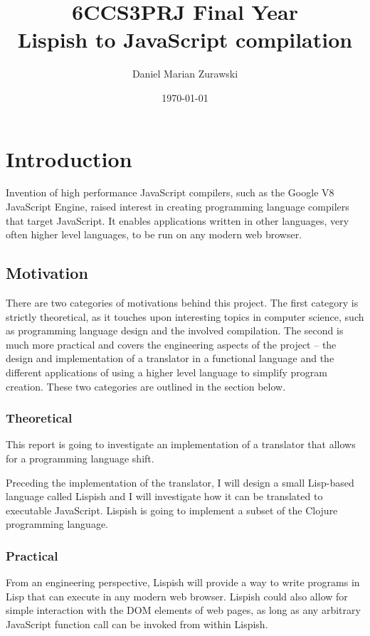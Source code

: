 \documentclass[11pt]{informatics-report}
\title{6CCS3PRJ Final Year\\\vspace{0.2cm}Lispish to JavaScript compilation}
\author{Daniel Marian Zurawski}
\date{\today}
\begin{document}
\createFrontMatter
\onehalfspacing
\tableofcontents
\doublespacing


\chapter{Introduction}
Invention of high performance JavaScript compilers, such as the Google V8 JavaScript Engine, raised interest in creating programming language 
compilers that target JavaScript. It enables applications written in other languages, very often higher level languages, to be run on any modern web browser.
 
 \section{Motivation}
There are two categories of motivations behind this project. The first category is strictly theoretical, as it touches upon interesting topics in computer science, such as programming language design and the involved compilation. The second is much more practical and covers the engineering aspects of the project -- the design and implementation of a translator in a functional language and the different applications of using a higher level language to simplify program creation.  
These two categories are outlined in the section below.


\subsection{Theoretical}
This report is going to investigate an implementation of a translator that allows for a programming language shift.

Preceding the implementation of the translator, I will design a small Lisp-based language called Lispish and I will investigate how it can be translated to executable JavaScript. Lispish is going to implement a subset of the Clojure programming language.

\subsection{Practical}
From an engineering perspective, Lispish will provide a way to write programs in Lisp that can execute in any modern web browser. Lispish could also allow for simple interaction with the DOM elements of web pages, as long as any arbitrary JavaScript function call can be invoked from within Lispish.
\end{document}
